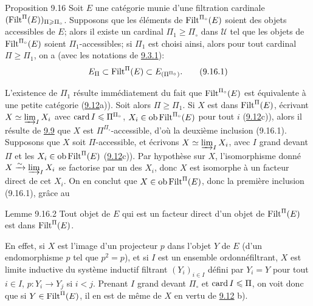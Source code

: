 \documentclass[10pt]{../fichiers-configuration-latex/smfart}
\begin{document}
\begin{enonce*}{Proposition 9.16}
Soit $E$ une catégorie munie d'une filtration cardinale
$(\operatorname{Filt}^{\Pi}(E))_{\Pi\geqslant\Pi_\circ}$. Supposons que les éléments de
$\operatorname{Filt}^{\Pi_\circ}(E)$ soient des objets accessibles de $E$; alors
il existe un cardinal $\Pi_1\geq\Pi_\circ$ dans $𝒰$ tel que
les objets de $\operatorname{Filt}^{\Pi_\circ}(E)$ soient $\Pi_1$-accessibles; si
$\Pi_1$ est choisi ainsi, alors pour tout cardinal $\Pi\geq \Pi_1$,
on a (avec les notations de \hyperref[I.sec9.3.1]{9.3.1}):
\begin{equation}
E_{\Pi}\subset \operatorname{Filt}^{\Pi}(E)\subset
E_{(\Pi^{\Pi_\circ})}{}.\tag{9.16.1}
\end{equation}
\end{enonce*}

L'existence de $\Pi_1$ résulte immédiatement du fait que
$\operatorname{Filt}^{\Pi_\circ}(E)$ est équivalente à une petite
catégorie (\hyperref[I.def9.12]{9.12}a)). Soit alors $\Pi\geq \Pi_1$. Si $X$
  est dans $\operatorname{Filt}^{\Pi}(E)$,
écrivant $X\simeq \varinjlim_I X_i$ avec $\operatorname{card} I\leqslant
\Pi^{\Pi_\circ}$, $X_i\in \operatorname{ob} \operatorname{Filt}^{\Pi_\circ}(E)$ pour tout $i$
(\hyperref[I.def9.12]{9.12}c)), alors il résulte de \hyperref[I.cor9.9]{9.9} que $X$ est
$\Pi^{\Pi_\circ}$-accessible, d'où la deuxième inclusion (9.16.1).
Supposons que $X$ soit $\Pi$-accessible, et écrivons $X\simeq
\varinjlim_I X_i$, avec $I$ grand devant $\Pi$ et les $X_i\in \operatorname{ob}
\operatorname{Filt}^{\Pi}(E)$ (\hyperref[I.def9.12]{9.12}c)). Par hypothèse sur $X$, l'isomorphisme
donné $X\xrightarrow{\sim} \varinjlim_I X_i$ se factorise par un des
$X_i$, donc $X$ est isomorphe à un facteur direct de cet $X_i$. On
en conclut que $X\in \operatorname{ob} \operatorname{Filt}^{\Pi}(E)$, donc la première inclusion
(9.16.1), grâce au

\begin{enonce*}{Lemme 9.16.2}
Tout objet de $E$ qui est un facteur direct d'un objet de
$\operatorname{Filt}^{\Pi}(E)$ est dans $\operatorname{Filt}^{\Pi}(E)$.
\end{enonce*}

En effet, si $X$ est l'image d'un projecteur $p$ dans l'objet $Y$ de
$E$ (\ie d'un endomorphisme $p$ tel que $p^2=p$), et si $I$ est un
ensemble ordonné\pageoriginale  filtrant, $X$ est limite inductive
du système inductif filtrant $(Y_i)_{i\in I}$ défini par $Y_i=Y$
pour tout $i\in I$, $p:Y_i\rightarrow Y_j$ si $i<j$. Prenant $I$
grand devant $\Pi_\circ$ et $\operatorname{card} I\leqslant \Pi$, on voit donc que si
$Y\in \operatorname{Filt}^{\Pi}(E)$, il en est de même de $X$ en vertu de
\hyperref[I.def9.12]{9.12} b).
\end{document}
